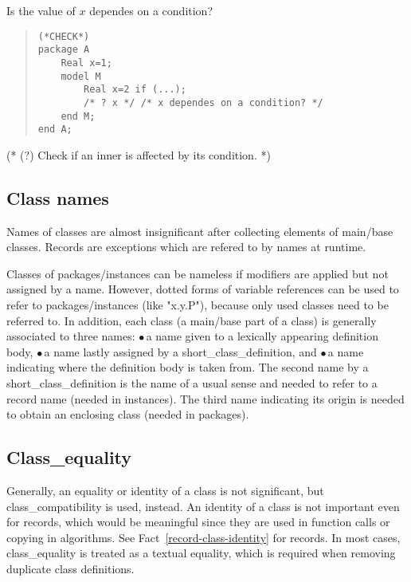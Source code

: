 \documentclass[10pt,b5paper]{article}
\begin{document}
Is the value of $x$ dependes on a condition?
\begin{quote}
\begin{lstlisting}[aboveskip=-\baselineskip]
(*CHECK*)
package A
    Real x=1;
    model M
        Real x=2 if (...);
        /* ? x */ /* x dependes on a condition? */
    end M;
end A;
\end{lstlisting}
\end{quote}

(* (?) Check if an inner is affected by its condition. *)


\subsection{Class names}

Names of classes are almost insignificant after collecting elements of
main/base classes.  Records are exceptions which are refered to by
names at runtime.

Classes of packages/instances can be nameless if modifiers are applied
but not assigned by a name.  However, dotted forms of variable
references can be used to refer to packages/instances (like "x.y.P"),
because only used classes need to be referred to.  In addition, each
class (a main/base part of a class) is generally associated to three
names: $\bullet$\,a name given to a lexically appearing definition
body, $\bullet$\,a name lastly assigned by a short_class_definition,
and $\bullet$\,a name indicating where the definition body is taken
from.  The second name by a short_class_definition is the name of a
usual sense and needed to refer to a record name (needed in
instances).  The third name indicating its origin is needed to obtain
an enclosing class (needed in packages).


\subsection{Class_equality}\label{sec:class-equality}

Generally, an equality or identity of a class is not significant, but
class_compatibility is used, instead.  An identity of a class is not
important even for records, which would be meaningful since they are
used in function calls or copying in algorithms.  See
Fact~\ref{record-class-identity} for records.  In most cases,
class_equality is treated as a textual equality, which is required
when removing duplicate class definitions.
\end{document}
